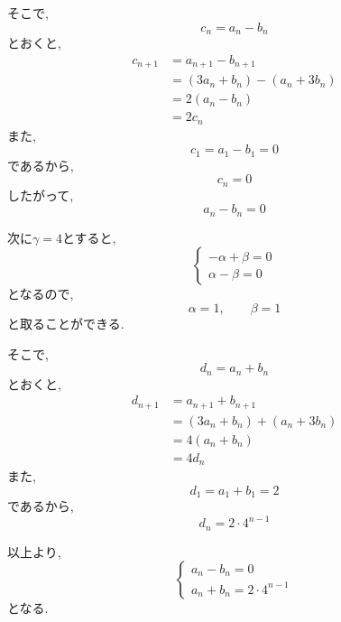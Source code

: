 \begin{enumerate}[label=(\arabic*),parsep=3pt]
\begin{enumerate}
                  そこで,
                  \[
                    c_n=a_n-b_n
                  \]
                  とおくと,
                  \begin{align*}
                    c_{n+1}
                      &=a_{n+1}-b_{n+1}\\
                      &=(3a_n+b_n)-(a_n+3b_n)\\
                      &=2(a_n-b_n)\\
                      &=2c_n
                  \end{align*}
                  また,
                  \[
                    c_1=a_1-b_1=0
                  \]
                  であるから,
                  \[
                    c_n=0
                  \]
                  したがって,
                  \[
                    a_n-b_n=0
                  \]

                  次に$\gamma=4$とすると,
                  \[
                  \begin{cases}
                    -\alpha+\beta=0\\
                    \alpha-\beta=0
                  \end{cases}
                  \]
                  となるので,
                  \[
                    \alpha=1,\qquad\beta=1
                  \]
                  と取ることができる.

                  そこで,
                  \[
                    d_n=a_n+b_n
                  \]
                  とおくと,
                  \begin{align*}
                    d_{n+1}
                      &=a_{n+1}+b_{n+1}\\
                      &=(3a_n+b_n)+(a_n+3b_n)\\
                      &=4(a_n+b_n)\\
                      &=4d_n
                  \end{align*}
                  また,
                  \[
                    d_1=a_1+b_1=2
                  \]
                  であるから,
                  \[
                    d_n=2\cdot4^{n-1}
                  \]

                  以上より,
                  \[
                  \begin{cases}
                    a_n-b_n=0\\
                    a_n+b_n=2\cdot4^{n-1}
                  \end{cases}
                  \]
                  となる.


\end{enumerate}
\end{enumerate}
